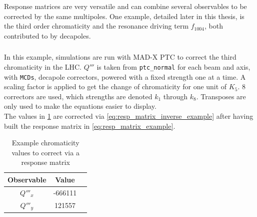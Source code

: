 Response matrices are very versatile and can combine several observables to be corrected by the same
multipoles. One example, detailed later in this thesis, is the third order chromaticity and the
resonance driving term $f_{1004}$, both contributed to by decapoles.

\subsubsection{}

In this example, simulations are run with MAD-X PTC to correct the third chromaticity in the LHC.
$Q'''$ is taken from \verb|ptc_normal| for each beam and axis, with \verb|MCDs|, decapole
correctors, powered with a fixed strength one at a time. A scaling factor is applied to get the
change of chromaticity for one unit of $K_5$.  8 correctors are used, which strengths are denoted
$k_1$ through $k_8$.  Transposes are only used to make the equations easier to display.\\
The values in \cref{table:resp_matrix_example} are corrected via
\cref{eq:resp_matrix_inverse_example} after having built the response matrix in
\cref{eq:resp_matrix_example}.

\begin{table}[H]
  \center
  \begin{tabular}{ccc}
    \toprule
      Observable & Value \\
    \midrule
      $Q'''_x$ & -666111 \\
      $Q'''_y$ &  121557 \\
    \bottomrule
  \end{tabular}
  \caption{Example chromaticity values to correct via a response matrix}
  \label{table:resp_matrix_example}
\end{table}

